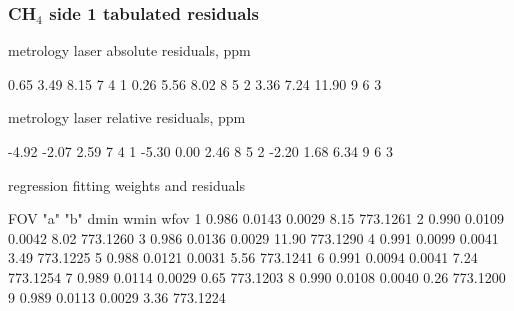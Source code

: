 \documentclass[9pt]{beamer}
\begin{document}
\begin{frame}[fragile]
\frametitle{CH$_4$ side 1 tabulated residuals}

  metrology laser absolute residuals, ppm
\begin{semiverbatim}\scriptsize
      0.65     3.49     8.15         7   4   1
      0.26     5.56     8.02         8   5   2
      3.36     7.24    11.90         9   6   3
\end{semiverbatim}

  metrology laser relative residuals, ppm
\begin{semiverbatim}\scriptsize
     -4.92    -2.07     2.59         7   4   1
     -5.30     0.00     2.46         8   5   2
     -2.20     1.68     6.34         9   6   3
\end{semiverbatim}

  regression fitting weights and residuals
\begin{semiverbatim}\scriptsize
 FOV   "a"       "b"     dmin     wmin      wfov
  1   0.986    0.0143   0.0029     8.15   773.1261 
  2   0.990    0.0109   0.0042     8.02   773.1260 
  3   0.986    0.0136   0.0029    11.90   773.1290 
  4   0.991    0.0099   0.0041     3.49   773.1225 
  5   0.988    0.0121   0.0031     5.56   773.1241 
  6   0.991    0.0094   0.0041     7.24   773.1254 
  7   0.989    0.0114   0.0029     0.65   773.1203 
  8   0.990    0.0108   0.0040     0.26   773.1200 
  9   0.989    0.0113   0.0029     3.36   773.1224 
\end{semiverbatim}

\end{frame}
\end{document}

